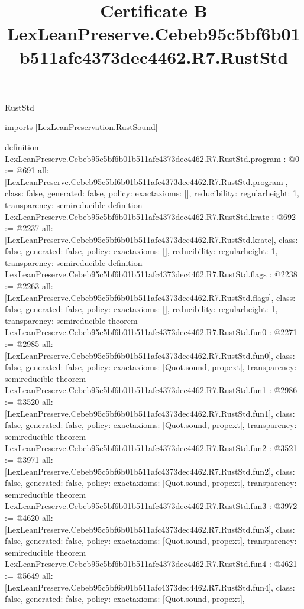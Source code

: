 \begin{lexlean}{RustStd}
\title{Certificate B LexLeanPreserve.Cebeb95c5bf6b01b511afc4373dec4462.R7.RustStd}
\begin{coremodule}
imports [LexLeanPreservation.RustSound]

definition LexLeanPreserve.Cebeb95c5bf6b01b511afc4373dec4462.R7.RustStd.program : @0 := @691 {
  all: [LexLeanPreserve.Cebeb95c5bf6b01b511afc4373dec4462.R7.RustStd.program],
  class: false,
  generated: false,
  policy: exact{axioms: []},
  reducibility: regular{height: 1},
  transparency: semireducible
}
definition LexLeanPreserve.Cebeb95c5bf6b01b511afc4373dec4462.R7.RustStd.krate : @692 := @2237 {
  all: [LexLeanPreserve.Cebeb95c5bf6b01b511afc4373dec4462.R7.RustStd.krate],
  class: false,
  generated: false,
  policy: exact{axioms: []},
  reducibility: regular{height: 1},
  transparency: semireducible
}
definition LexLeanPreserve.Cebeb95c5bf6b01b511afc4373dec4462.R7.RustStd.flags : @2238 := @2263 {
  all: [LexLeanPreserve.Cebeb95c5bf6b01b511afc4373dec4462.R7.RustStd.flags],
  class: false,
  generated: false,
  policy: exact{axioms: []},
  reducibility: regular{height: 1},
  transparency: semireducible
}
theorem LexLeanPreserve.Cebeb95c5bf6b01b511afc4373dec4462.R7.RustStd.fun0 : @2271 := @2985 {
  all: [LexLeanPreserve.Cebeb95c5bf6b01b511afc4373dec4462.R7.RustStd.fun0],
  class: false,
  generated: false,
  policy: exact{axioms: [Quot.sound, propext]},
  transparency: semireducible
}
theorem LexLeanPreserve.Cebeb95c5bf6b01b511afc4373dec4462.R7.RustStd.fun1 : @2986 := @3520 {
  all: [LexLeanPreserve.Cebeb95c5bf6b01b511afc4373dec4462.R7.RustStd.fun1],
  class: false,
  generated: false,
  policy: exact{axioms: [Quot.sound, propext]},
  transparency: semireducible
}
theorem LexLeanPreserve.Cebeb95c5bf6b01b511afc4373dec4462.R7.RustStd.fun2 : @3521 := @3971 {
  all: [LexLeanPreserve.Cebeb95c5bf6b01b511afc4373dec4462.R7.RustStd.fun2],
  class: false,
  generated: false,
  policy: exact{axioms: [Quot.sound, propext]},
  transparency: semireducible
}
theorem LexLeanPreserve.Cebeb95c5bf6b01b511afc4373dec4462.R7.RustStd.fun3 : @3972 := @4620 {
  all: [LexLeanPreserve.Cebeb95c5bf6b01b511afc4373dec4462.R7.RustStd.fun3],
  class: false,
  generated: false,
  policy: exact{axioms: [Quot.sound, propext]},
  transparency: semireducible
}
theorem LexLeanPreserve.Cebeb95c5bf6b01b511afc4373dec4462.R7.RustStd.fun4 : @4621 := @5649 {
  all: [LexLeanPreserve.Cebeb95c5bf6b01b511afc4373dec4462.R7.RustStd.fun4],
  class: false,
  generated: false,
  policy: exact{axioms: [Quot.sound, propext]},
}
\end{coremodule}
\end{lexlean}
